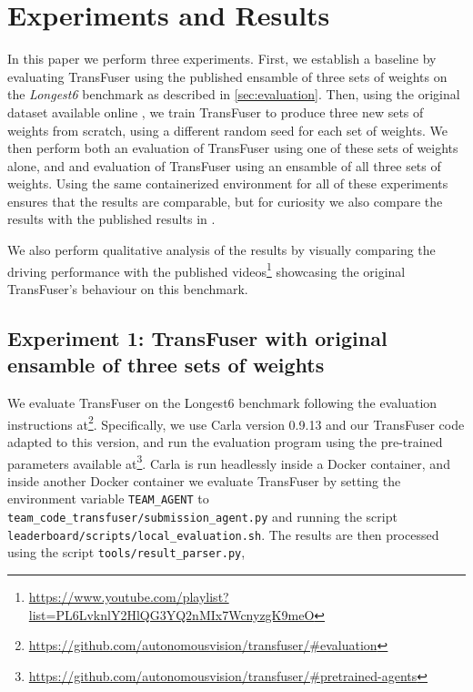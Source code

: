 \chapter{Experiments and Results}
\label{chap:results}



In this paper we perform three experiments.
First, we establish a baseline 
by evaluating TransFuser using the published ensamble of three sets of weights on the \textit{Longest6} benchmark
as described in \autoref{sec:evaluation}.
Then, using the original dataset available online ,
we train TransFuser to produce three new sets of weights from scratch,
using a different random seed for each set of weights.
We then perform both an evaluation of TransFuser using one of these sets of weights alone,
and and evaluation of TransFuser using an ensamble of all three sets of weights.
Using the same containerized environment for all of these experiments ensures that the results are comparable,
but for curiosity we also compare the results with the published results in \cite{transfuser-pami}.

We also perform qualitative analysis of the results by visually comparing the driving performance
with the published videos\footnote{\url{https://www.youtube.com/playlist?list=PL6LvknlY2HlQG3YQ2nMIx7WcnyzgK9meO}}
showcasing the original TransFuser's behaviour on this benchmark.


\section{Experiment 1: TransFuser with original ensamble of three sets of weights}
\label{sec:experiment1}

We evaluate TransFuser on the Longest6 benchmark following the evaluation instructions at\footnote{
\url{https://github.com/autonomousvision/transfuser/\#evaluation}}.
Specifically,
we use Carla version 0.9.13 and our TransFuser code adapted to this version,
and run the evaluation program using the pre-trained parameters available at\footnote{
\url{https://github.com/autonomousvision/transfuser/\#pretrained-agents}}.
Carla is run headlessly inside a Docker container,
and inside another Docker container we evaluate TransFuser
by setting the environment variable \texttt{TEAM\_AGENT} to \texttt{team\_code\_transfuser/submission\_agent.py}
and running the script \texttt{leaderboard/scripts/local\_evaluation.sh}.
The results are then processed using the script \texttt{tools/result\_parser.py},


